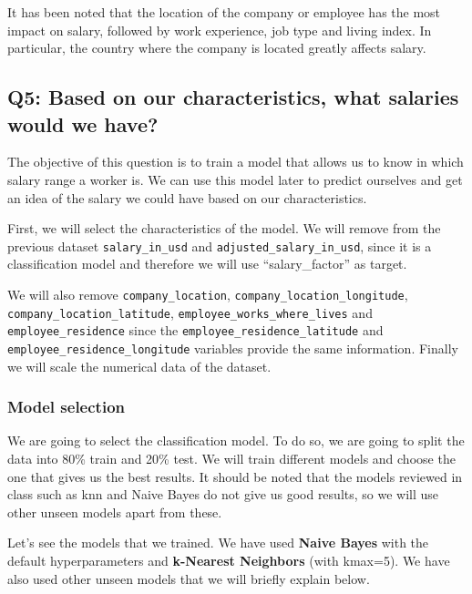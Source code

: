 \documentclass[
]{article}
\begin{document}
It has been noted that the location of the company or employee has the
most impact on salary, followed by work experience, job type and living
index. In particular, the country where the company is located greatly
affects salary.

\hypertarget{q5-based-on-our-characteristics-what-salaries-would-we-have}{%
\subsection{Q5: Based on our characteristics, what salaries would we
have?}\label{q5-based-on-our-characteristics-what-salaries-would-we-have}}

The objective of this question is to train a model that allows us to
know in which salary range a worker is. We can use this model later to
predict ourselves and get an idea of the salary we could have based on
our characteristics.

First, we will select the characteristics of the model. We will remove
from the previous dataset \texttt{salary\_in\_usd} and
\texttt{adjusted\_salary\_in\_usd}, since it is a classification model
and therefore we will use ``salary\_factor'' as target.

We will also remove \texttt{company\_location},
\texttt{company\_location\_longitude},
\texttt{company\_location\_latitude},
\texttt{employee\_works\_where\_lives} and \texttt{employee\_residence}
since the \texttt{employee\_residence\_latitude} and
\texttt{employee\_residence\_longitude} variables provide the same
information. Finally we will scale the numerical data of the dataset.

\hypertarget{model-selection}{%
\subsubsection{Model selection}\label{model-selection}}

We are going to select the classification model. To do so, we are going
to split the data into 80\% train and 20\% test. We will train different
models and choose the one that gives us the best results. It should be
noted that the models reviewed in class such as knn and Naive Bayes do
not give us good results, so we will use other unseen models apart from
these.

Let's see the models that we trained. We have used \textbf{Naive Bayes}
with the default hyperparameters and \textbf{k-Nearest Neighbors} (with
kmax=5). We have also used other unseen models that we will briefly
explain below.
\end{document}
